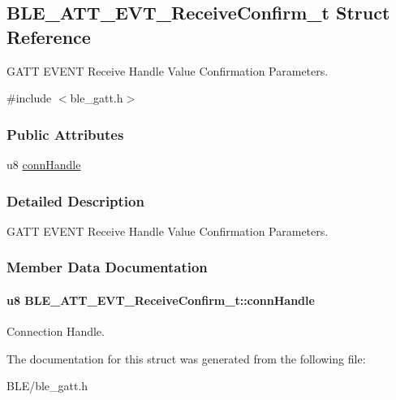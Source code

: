 \hypertarget{struct_b_l_e___a_t_t___e_v_t___receive_confirm__t}{}\subsection{B\+L\+E\+\_\+\+A\+T\+T\+\_\+\+E\+V\+T\+\_\+\+Receive\+Confirm\+\_\+t Struct Reference}
\label{struct_b_l_e___a_t_t___e_v_t___receive_confirm__t}


G\+A\+TT E\+V\+E\+NT Receive Handle Value Confirmation Parameters.  




{\ttfamily \#include $<$ble\+\_\+gatt.\+h$>$}

\subsubsection*{Public Attributes}
\begin{DoxyCompactItemize}
\item 
u8 \hyperlink{struct_b_l_e___a_t_t___e_v_t___receive_confirm__t_ab30226dd1a5f818fcc064133819743bd}{conn\+Handle}
\end{DoxyCompactItemize}


\subsubsection{Detailed Description}
G\+A\+TT E\+V\+E\+NT Receive Handle Value Confirmation Parameters. 

\subsubsection{Member Data Documentation}
\paragraph[{\texorpdfstring{conn\+Handle}{connHandle}}]{\setlength{\rightskip}{0pt plus 5cm}u8 B\+L\+E\+\_\+\+A\+T\+T\+\_\+\+E\+V\+T\+\_\+\+Receive\+Confirm\+\_\+t\+::conn\+Handle}\hypertarget{struct_b_l_e___a_t_t___e_v_t___receive_confirm__t_ab30226dd1a5f818fcc064133819743bd}{}\label{struct_b_l_e___a_t_t___e_v_t___receive_confirm__t_ab30226dd1a5f818fcc064133819743bd}
Connection Handle. 

The documentation for this struct was generated from the following file\+:\begin{DoxyCompactItemize}
\item 
B\+L\+E/ble\+\_\+gatt.\+h\end{DoxyCompactItemize}
